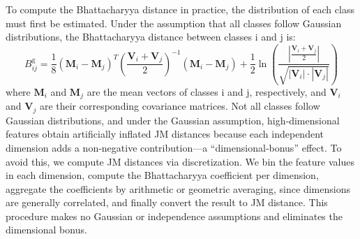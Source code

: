 To compute the Bhattacharyya distance in practice, the distribution of each class must first be estimated. Under the assumption that all classes follow Gaussian distributions, the Bhattacharyya distance between classes i and j is:
\begin{equation}
    B_{ij}^{\text{g}} = \frac{1}{8} (\mathbf{M}_i - \mathbf{M}_j)^T \left( \frac{\mathbf{V}_i + \mathbf{V}_j}{2} \right)^{-1} (\mathbf{M}_i - \mathbf{M}_j) + \frac{1}{2} \ln \left( \frac{ | \frac{\mathbf{V}_i + \mathbf{V}_j}{2} | }{ \sqrt{ | \mathbf{V}_i | \cdot | \mathbf{V}_j | } } \right)
\end{equation}
where $\mathbf{M}_i$ and $\mathbf{M}_j$ are the mean vectors of classes i and j, respectively, and $\mathbf{V}_i$ and $\mathbf{V}_j$ are their corresponding covariance matrices.
Not all classes follow Gaussian distributions, and under the Gaussian assumption, high‑dimensional features obtain artificially inflated JM distances because each independent dimension adds a non‑negative contribution—a “dimensional‑bonus” effect. To avoid this, we compute JM distances via discretization. We bin the feature values in each dimension, compute the Bhattacharyya coefficient per dimension, aggregate the coefficients by arithmetic or geometric averaging, since dimensions are generally correlated, and finally convert the result to JM distance. This procedure makes no Gaussian or independence assumptions and eliminates the dimensional bonus.
